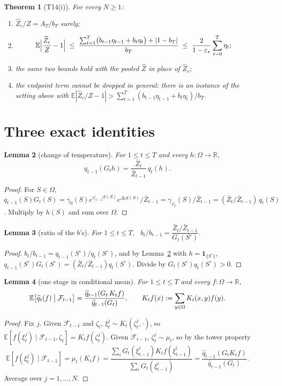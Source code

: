 \documentclass[11pt]{article}
\newtheorem{theorem}{Theorem}
\newtheorem{lemma}[theorem]{Lemma}
\theoremstyle{remark}
\newcommand{\E}{\mathbb{E}}
\newcommand{\F}{\mathcal{F}}
\newcommand{\Om}{\Omega}
\newcommand{\qh}{\widehat q}
\newcommand{\Zh}{\widehat Z}
\newcommand{\Zb}{\bar Z}
\newcommand{\So}{S^{\circ}}
\begin{document}
\begin{theorem}[T14(i)]\label{thm:main}
For every $N\ge1$:
\begin{enumerate}[label=(i-\alph*)]
\item $\Zh_r/Z=A_T/b_T$ surely;
\item
  \[
  \E\Bigl|\frac{\Zh_r}{Z}-1\Bigr|\;\le\;\frac{\sum_{t=1}^T\bigl(b_{t-1}\eta_{t-1}+b_t\eta_t\bigr)+|1-b_T|}{b_T}
  \;\le\;\frac{2}{1-\varepsilon_*}\sum_{t=0}^T\eta_t ;
  \]
\item the same two bounds hold with the pooled $\Zh$ in place of $\Zh_r$;
\item the endpoint term cannot be dropped in general: there is an instance of the setting above with
  $\E|\Zh_r/Z-1|>\sum_{t=1}^T(b_{t-1}\eta_{t-1}+b_t\eta_t)/b_T$.
\end{enumerate}
\end{theorem}

\section{Three exact identities}

\begin{lemma}[change of temperature]\label{lem:change}
For $1\le t\le T$ and every $h:\Om\to\mathbb R$,
\[
q_{t-1}(G_t h)=\frac{\Zb_t}{\Zb_{t-1}}\,q_t(h).
\]
\end{lemma}
\begin{proof}
For $S\in\Om$,
$q_{t-1}(S)G_t(S)=\gamma_0(S)e^{\varphi_{t-1}d(S)}e^{\Delta_t d(S)}/\Zb_{t-1}=\gamma_{\varphi_t}(S)/\Zb_{t-1}
=(\Zb_t/\Zb_{t-1})\,q_t(S)$. Multiply by $h(S)$ and sum over $\Om$.
\end{proof}

\begin{lemma}[ratio of the $b$'s]\label{lem:b}
For $1\le t\le T$, \ $b_t/b_{t-1}=\dfrac{\Zb_t/\Zb_{t-1}}{G_t(\So)}$.
\end{lemma}
\begin{proof}
$b_t/b_{t-1}=q_{t-1}(\So)/q_t(\So)$, and by Lemma~\ref{lem:change} with $h=\mathbf 1_{\{\So\}}$,
$q_{t-1}(\So)G_t(\So)=(\Zb_t/\Zb_{t-1})q_t(\So)$. Divide by $G_t(\So)q_t(\So)>0$.
\end{proof}

\begin{lemma}[one stage in conditional mean]\label{lem:step}
For $1\le t\le T$ and every $f:\Om\to\mathbb R$,
\[
\E\bigl[\qh_t(f)\bigm|\F_{t-1}\bigr]=\frac{\qh_{t-1}(G_t\,K_tf)}{\qh_{t-1}(G_t)},
\qquad K_tf(x):=\sum_{y\in\Om}K_t(x,y)f(y).
\]
\end{lemma}
\begin{proof}
Fix $j$. Given $\F_{t-1}$ and $\zeta_t$, $\xi_t^j\sim K_t(\zeta_t^j,\cdot)$, so
$\E[f(\xi_t^j)\mid\F_{t-1},\zeta_t]=K_tf(\zeta_t^j)$. Given $\F_{t-1}$, $\zeta_t^j\sim\mu_t$, so by the tower property
\[
\E[f(\xi_t^j)\mid\F_{t-1}]=\mu_t(K_tf)=\frac{\sum_iG_t(\xi_{t-1}^i)K_tf(\xi_{t-1}^i)}{\sum_iG_t(\xi_{t-1}^i)}
=\frac{\qh_{t-1}(G_tK_tf)}{\qh_{t-1}(G_t)}.
\]
Average over $j=1,\dots,N$.
\end{proof}
\end{document}
